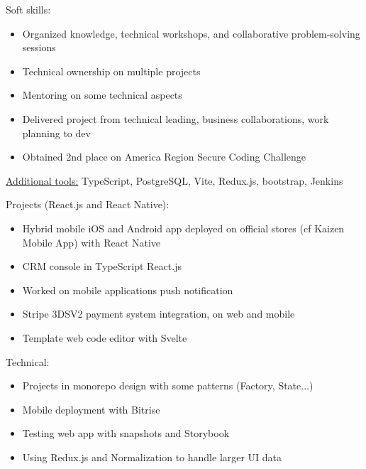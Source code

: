 \documentclass[11pt,a4paper,ragged2e,withhyper]{altacv}
\begin{document}
\medskip
Soft skills:
\begin{itemize}
  \item Organized knowledge, technical workshops, and collaborative problem-solving sessions
  \item Technical ownership on multiple projects
  \item Mentoring on some technical aspects
  \item Delivered project from technical leading, business collaborations, work planning to dev
  \item Obtained 2nd place on America Region Secure Coding Challenge
\end{itemize}
\begin{itshape}
\underline{Additional tools:}
\small{TypeScript, PostgreSQL, Vite, Redux.js, bootstrap, Jenkins}
\end{itshape}

\divider

\vspace{-.5\baselineskip}
\begin{minipage}[t]{0.45\textwidth}
  \vspace{0pt}
Projects (React.js and React Native):
  \begin{itemize}
    \item Hybrid mobile iOS and Android app deployed on official stores (cf Kaizen
    Mobile App) with React Native
    \item CRM console in TypeScript React.js
    \item Worked on mobile applications push notification
    \item Stripe 3DSV2 payment system integration, on web and mobile
    \item Template web code editor with Svelte
  \end{itemize}
\end{minipage}
\hfill
\begin{minipage}[t]{0.45\textwidth}
  \vspace{0pt}
  Technical:
  \begin{itemize}
    \item Projects in monorepo design with some patterns (Factory, State...)
    \item Mobile deployment with Bitrise
    \item Testing web app with snapshots and Storybook
    \item Using Redux.js and Normalization to handle larger UI data
  \end{itemize}
\end{minipage}
\end{document}

